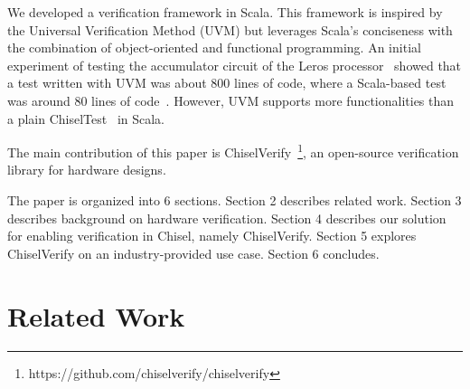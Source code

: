 \documentclass[conference]{IEEEtran}
\newcommand{\todo}[1]{{\color{olive} TODO: #1}}
\renewcommand{\todo}[1]{}
\begin{document}
We developed a verification framework in Scala.
This framework is inspired by the Universal Verification Method (UVM) but leverages Scala's conciseness with the
combination of object-oriented and functional programming.
An initial experiment of testing the accumulator circuit of the Leros processor~\cite{leros:arcs2019}
showed that a test written with UVM was about 800 lines of code, where a Scala-based
test was around 80 lines of code~\cite{verify:chisel:2020}.
However, UVM supports more functionalities than a plain ChiselTest~\cite{chisel:tester2} in Scala.

%
%
%


The main contribution of this paper is ChiselVerify~\footnote{https://github.com/chiselverify/chiselverify}, an open-source verification library for hardware designs.

The paper is organized into 6 sections.
Section 2 describes related work.
Section 3 describes background on hardware verification.
Section 4 describes our solution for enabling verification in Chisel, namely ChiselVerify.
Section 5 explores ChiselVerify on an industry-provided use case.
Section 6 concludes.

\section{Related Work}
\end{document}
